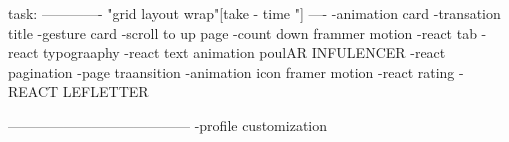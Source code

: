 task:
-------------
"grid layout wrap"[take - time "]
----
-animation card 
-transation title  
-gesture card 
-scroll to up page 
-count down frammer motion
-react tab 
-react typograaphy 
-react text animation  poulAR INFULENCER 
-react pagination 
-page  traansition 
-animation icon framer motion
-react rating 
-REACT LEFLETTER  

---------------------------------------
-profile customization

